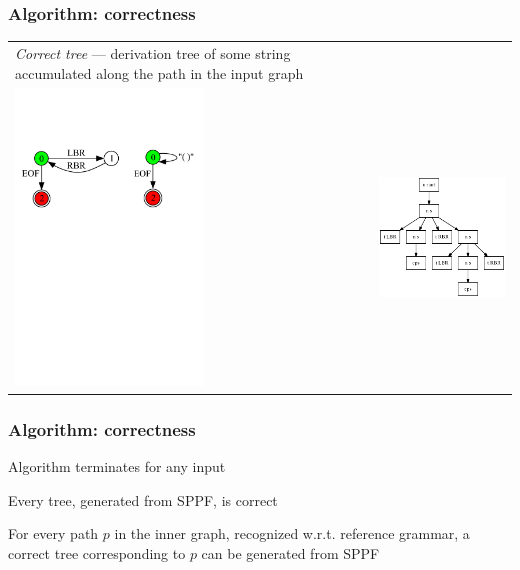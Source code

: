 \documentclass{beamer}
\begin{document}
\begin{frame}
\transwipe[direction=90]
\frametitle{Algorithm: correctness}
\begin{tabular}{p{5.3cm} p{6.7cm}}
\emph{Correct tree} --- derivation tree of some string accumulated along the 
path in the input graph
&
\\
\includegraphics[width=5cm]{pictures/in31.pdf}
&
\includegraphics[width=6cm]{pictures/sppf2.eps}
\end{tabular}
\end{frame}


\begin{frame}
  \transwipe[direction=90]
  \frametitle{Algorithm: correctness}
  \begin{theorem}[Termination]
  \normalfont	
    Algorithm terminates for any input
  \end{theorem}
  
  \begin{theorem}[Correctness]
  \normalfont  
    Every tree, generated from SPPF, is correct
  \end{theorem}

  \begin{theorem}[Correctness]
  \normalfont
    For every path $p$ in the inner graph, recognized w.r.t. reference
grammar, a correct tree corresponding to $p$ can be generated from SPPF
  \end{theorem}
\end{frame}
\end{document}
